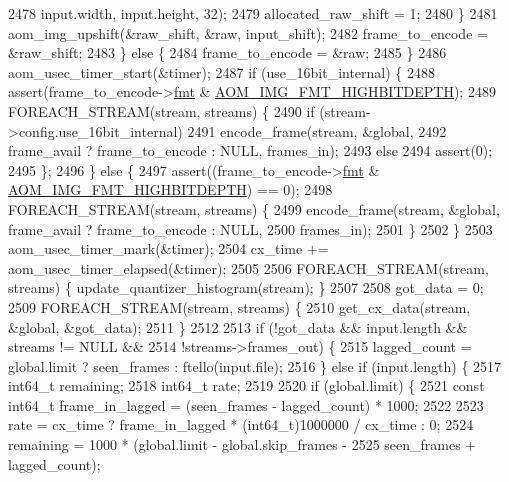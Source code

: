 \begin{DoxyCodeInclude}
{{{{{{{{{{{{{{{{{{{{{{{{{{{{{{{{{{{{{{{{{{{{{{{{{{{{{{{{{{{2478                           input.width, input.height, 32);
2479             allocated\_raw\_shift = 1;
2480           \}
2481           aom\_img\_upshift(&raw\_shift, &raw, input\_shift);
2482           frame\_to\_encode = &raw\_shift;
2483         \} \textcolor{keywordflow}{else} \{
2484           frame\_to\_encode = &raw;
2485         \}
2486         aom\_usec\_timer\_start(&timer);
2487         \textcolor{keywordflow}{if} (use\_16bit\_internal) \{
2488           assert(frame\_to\_encode->\hyperlink{structaom__image_a6c64b1ab918d80d52eb8f5d6d957e825}{fmt} & \hyperlink{aom__image_8h_a607b37d91f75442f54223ecd85f1b6cb}{AOM\_IMG\_FMT\_HIGHBITDEPTH});
2489           FOREACH\_STREAM(stream, streams) \{
2490             \textcolor{keywordflow}{if} (stream->config.use\_16bit\_internal)
2491               encode\_frame(stream, &global,
2492                            frame\_avail ? frame\_to\_encode : NULL, frames\_in);
2493             \textcolor{keywordflow}{else}
2494               assert(0);
2495           \};
2496         \} \textcolor{keywordflow}{else} \{
2497           assert((frame\_to\_encode->\hyperlink{structaom__image_a6c64b1ab918d80d52eb8f5d6d957e825}{fmt} & \hyperlink{aom__image_8h_a607b37d91f75442f54223ecd85f1b6cb}{AOM\_IMG\_FMT\_HIGHBITDEPTH}) == 0);
2498           FOREACH\_STREAM(stream, streams) \{
2499             encode\_frame(stream, &global, frame\_avail ? frame\_to\_encode : NULL,
2500                          frames\_in);
2501           \}
2502         \}
2503         aom\_usec\_timer\_mark(&timer);
2504         cx\_time += aom\_usec\_timer\_elapsed(&timer);
2505 
2506         FOREACH\_STREAM(stream, streams) \{ update\_quantizer\_histogram(stream); \}
2507 
2508         got\_data = 0;
2509         FOREACH\_STREAM(stream, streams) \{
2510           get\_cx\_data(stream, &global, &got\_data);
2511         \}
2512 
2513         \textcolor{keywordflow}{if} (!got\_data && input.length && streams != NULL &&
2514             !streams->frames\_out) \{
2515           lagged\_count = global.limit ? seen\_frames : ftello(input.file);
2516         \} \textcolor{keywordflow}{else} \textcolor{keywordflow}{if} (input.length) \{
2517           int64\_t remaining;
2518           int64\_t rate;
2519 
2520           \textcolor{keywordflow}{if} (global.limit) \{
2521             \textcolor{keyword}{const} int64\_t frame\_in\_lagged = (seen\_frames - lagged\_count) * 1000;
2522 
2523             rate = cx\_time ? frame\_in\_lagged * (int64\_t)1000000 / cx\_time : 0;
2524             remaining = 1000 * (global.limit - global.skip\_frames -
2525                                 seen\_frames + lagged\_count);
}}}}}}}}}}}}}}}}}}}}}}}}}}}}}}}}}}}}}}}}}}}}}}}}}}}}}}}}}}}
\end{DoxyCodeInclude}
